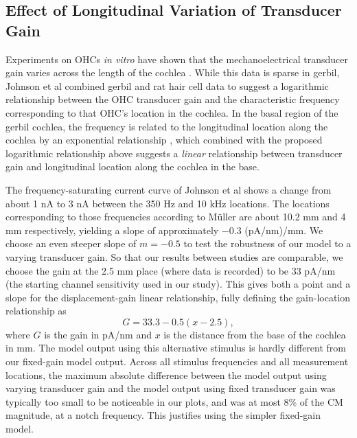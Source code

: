 \documentclass{article}
\begin{document}
 \subsection{Effect of Longitudinal Variation of Transducer Gain}
\par{ {Experiments on OHCs \textit{in vitro} have shown that the mechanoelectrical transducer gain varies across the length of the cochlea \cite{johnson_2011}. While this data is sparse in gerbil, Johnson et al \cite{johnson_2011} combined gerbil and rat hair cell data to suggest a logarithmic relationship between the OHC transducer gain and the characteristic frequency corresponding to that OHC's location in the cochlea. In the basal region of the gerbil cochlea, the frequency is related to the longitudinal location along the cochlea by an exponential relationship \cite{muller}, which combined with the proposed logarithmic relationship above suggests a \textit{linear} relationship between transducer gain and longitudinal location along the cochlea in the base.}}
\par{ {The frequency-saturating current curve of Johnson et al shows a change from about 1 nA to 3 nA between the 350 Hz and 10 kHz locations. The locations corresponding to those frequencies according to M\"uller are about 10.2 mm and 4 mm respectively, yielding a slope of approximately $-0.3$ (pA/nm)/mm. We choose an even steeper slope of $m= -0.5$ to test the robustness of our model to a varying transducer gain. So that our results between studies are comparable, we choose the gain at the 2.5 mm place (where data is recorded) to be 33 pA/nm (the starting channel sensitivity used in our study). This gives both a point and a slope for the displacement-gain linear relationship, fully defining the gain-location relationship as
\begin{equation}
    G = 33.3-0.5(x-2.5),
\end{equation}
where $G$ is the gain in pA/nm and $x$ is the distance from the base of the cochlea in mm. The model output using this alternative stimulus is hardly different from our fixed-gain model output. Across all stimulus frequencies and all measurement locations, the maximum absolute difference between the model output using varying transducer gain and the model output using fixed transducer gain was typically too small to be noticeable in our plots, and was at most 8\% of the CM magnitude, at a notch frequency. This justifies using the simpler fixed-gain model.}}
\end{document}
